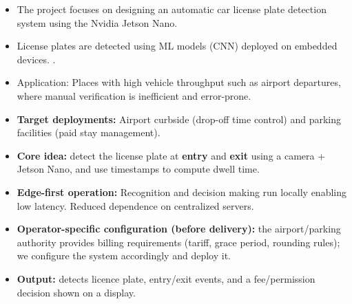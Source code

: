 %


{
	\begin{itemize}
		\item The project focuses on designing an automatic car license plate detection system using the Nvidia Jetson Nano.
		\item  License plates are detected using ML models (CNN) deployed on embedded devices. \cite{Tan+22} \cite{jocher2023ultralytics,Cor21}.		
		\item Application: Places with high vehicle throughput such as airport departures, where manual verification is inefficient and error-prone. 
		 
	\end{itemize}
	
}

	
{
	\begin{itemize}
		\item \textbf{Target deployments:} Airport curbside (drop-off time control) and parking facilities (paid stay management).
		\item \textbf{Core idea:} detect the license plate at \textbf{entry} and \textbf{exit} using a camera + Jetson Nano, and use timestamps to compute dwell time.
		\item \textbf{Edge-first operation:} Recognition and decision making run locally enabling low latency. Reduced dependence on centralized servers.
		\item \textbf{Operator-specific configuration (before delivery):} the airport/parking authority provides billing requirements (tariff, grace period, rounding rules); we configure the system accordingly and deploy it.
		\item \textbf{Output:} detects licence plate, entry/exit events, and a fee/permission decision shown on a display.
	\end{itemize}
}

